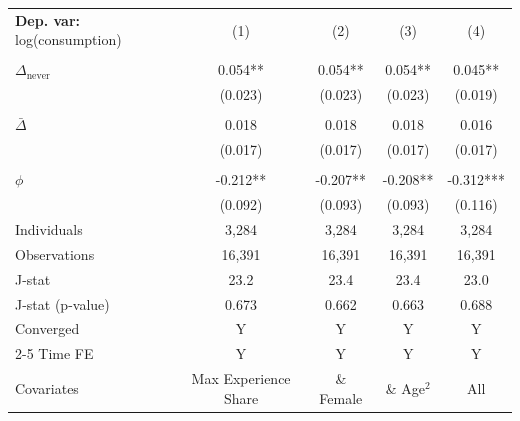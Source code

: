 \begin{tabular}{l cccc} \toprule  \textbf{Dep. var:}  log(consumption) 
                    &\multicolumn{1}{c}{(1)}   &\multicolumn{1}{c}{(2)}   &\multicolumn{1}{c}{(3)}   &\multicolumn{1}{c}{(4)}   \\
                    &               &               &               &               \\
\addlinespace
$\Delta_{\text{never}}$&       0.054** &       0.054** &       0.054** &       0.045** \\
                    &     (0.023)   &     (0.023)   &     (0.023)   &     (0.019)   \\
                    &               &               &               &               \\
\addlinespace
$\bar{\Delta}$      &       0.018   &       0.018   &       0.018   &       0.016   \\
                    &     (0.017)   &     (0.017)   &     (0.017)   &     (0.017)   \\
                    &               &               &               &               \\
\addlinespace
$\phi$              &      -0.212** &      -0.207** &      -0.208** &      -0.312***\\
                    &     (0.092)   &     (0.093)   &     (0.093)   &     (0.116)   \\
\addlinespace
Individuals         &       3,284   &       3,284   &       3,284   &       3,284   \\
Observations        &      16,391   &      16,391   &      16,391   &      16,391   \\
J-stat              &        23.2   &        23.4   &        23.4   &        23.0   \\
J-stat (p-value)    &       0.673   &       0.662   &       0.663   &       0.688   \\
Converged           &           Y   &           Y   &           Y   &           Y   \\
\cmidrule{2-5} Time FE & Y & Y & Y & Y \\ Covariates & Max Experience Share & \& Female & \& Age$^2$ & All \\ \bottomrule \end{tabular}
